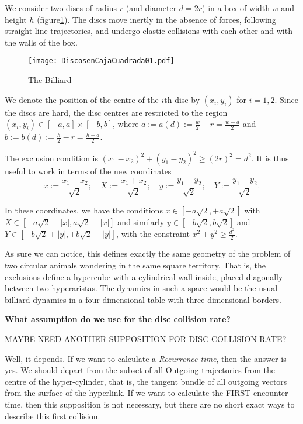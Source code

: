 \documentclass[letterpaper,10pt]{article}
\newcommand{\defeq}{:=}
\begin{document}
We consider two discs of radius $r$ (and diameter $d=2r$) 
in a box of width $w$ and height $h$ (figure\ref{billar01}). 
The discs move inertly in the absence of forces, 
following straight-line trajectories, 
and undergo elastic collisions with each other and with the walls of the box.

\begin{figure}
  \centering
  \texttt{[image: DiscosenCajaCuadrada01.pdf]}
  \caption{The Billiard}\label{billar01}
\end{figure}


We denote the position of the centre of the $i$th disc by $(x_{i}, y_{i})$ for $i=1,2$. Since the discs are hard, the disc centres are restricted to the region $(x_i, y_i) \in [-a,a] \times [-b, b]$, where $a \defeq a(d) \defeq \frac{w}{2} - r = \frac{w-d}{2}$ and $b \defeq b(d) \defeq \frac{h}{2} - r = \frac{h-d}{2}$.

The exclusion condition is $(x_1-x_2)^2 + (y_1-y_2)^2 \ge (2r)^2 = d^2$.
It is thus useful to work in terms of the new coordinates
\begin{equation}\label{cambiocoor01}
 x \defeq \frac{x_1 - x_2}{\sqrt{2}}; 
\quad X \defeq \frac{x_1 + x_2}{\sqrt{2}}; 
\quad y \defeq \frac{y_1 - y_2}{\sqrt{2}}; 
\quad Y \defeq \frac{y_1 + y_2}{\sqrt{2}}.
\end{equation}


In these coordinates, we have the conditions $x \in [-a \sqrt{2}, +a \sqrt{2}]$ with $X \in [-a \sqrt{2} + |x|, a \sqrt{2} - |x|]$ and similarly $y \in [-b \sqrt{2}, b \sqrt{2}]$ and $Y \in [-b \sqrt{2} + |y|, +b \sqrt{2} - |y|]$,  with the constraint $x^2 + y^2 \ge \frac{d^2}{2}$.

As sure we can notice, this defines exactly the same geometry of
the problem of two circular animals wandering in the same square territory. That is,
the exclusions define a hypercube with a cylindrical wall inside, placed
diagonally between two hyperaristas. The dynamics in such a space
would be the usual billiard dynamics in a four dimensional table with
three dimensional borders.

\textbf{What assumption do we use for the disc collision rate?}

MAYBE NEED ANOTHER SUPPOSITION FOR DISC COLLISION RATE?

Well, it depends. If we want to calculate a \emph{Recurrence time}, 
then the answer is yes.
We should depart from the subset of all Outgoing trajectories from the centre of the
hyper-cylinder, that is, the tangent bundle of all outgoing vectors from 
the surface of the hyperlink. If we want to calculate the FIRST encounter time, then
this supposition is not necessary, 
but there are no short exact ways to describe this first collision. 
\end{document}
